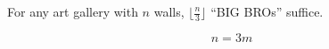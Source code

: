 \begin{frame}{}
  \begin{theorem}
    For any art gallery with $n$ walls, $\lfloor \frac{n}{3} \rfloor$ ``BIG BROs'' suffice.
  \end{theorem}

  \pause
  \vspace{0.80cm}

  \[
    n = 3m
  \]
\end{frame}
